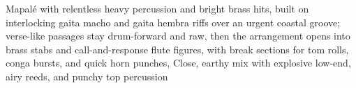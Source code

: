 
\begin{notes}
\end{notes}
\begin{prompt}
Mapalé with relentless heavy percussion and bright brass hits, built on interlocking gaita macho and gaita hembra riffs over an urgent coastal groove; verse-like passages stay drum-forward and raw, then the arrangement opens into brass stabs and call-and-response flute figures, with break sections for tom rolls, conga bursts, and quick horn punches, Close, earthy mix with explosive low-end, airy reeds, and punchy top percussion
\end{prompt}

